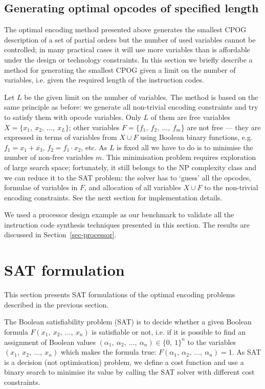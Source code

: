 \subsection{Generating optimal opcodes of specified length\label{Sec:Generating-optimal-opcodes}}

The optimal encoding method presented above generates the smallest
CPOG description of a set of partial orders but the number of used
variables cannot be controlled; in many practical cases it will use
more variables than is affordable under the design or technology constraints.
In this section we briefly describe a method for generating the smallest
CPOG given a limit on the number of variables, i.e. given the required
length of the instruction codes.

Let $L$ be the given limit on the number of variables. The method
is based on the same principle as before: we generate all non-trivial
encoding constraints and try to satisfy them with opcode variables.
Only $L$ of them are free variables $X=\{x_{1},\ x_{2},\ ...,\ x_{L}\}$;
other variables $F=\{f_{1},\ f_{2},\ ...,\ f_{m}$\} are not free
--- they are expressed in terms of variables from $X\cup F$ using
Boolean binary functions, e.g. $f_{1}=x_{1}+\overline{x_{3}}$, $f_{2}=f_{1}\cdot x_{2}$,
etc. As $L$ is fixed all we have to do is to minimise the number
of non-free variables $m$. This minimisation problem requires exploration
of large search space; fortunately, it still belongs to the NP complexity
class and we can reduce it to the SAT problem: the solver has to `guess'
all the opcodes, formulae of variables in $F$, and allocation of
all variables $X\cup F$ to the non-trivial encoding constraints.
See the next section for implementation details.

We used a processor design example as our benchmark to validate all
the instruction code synthesis techniques presented in this section.
The results are discussed in Section~\ref{sec-processor}.



\section{SAT formulation\label{sec:SAT-formulation}}

This section presents SAT formulations of the optimal encoding problems
described in the previous section.

The Boolean satisfiability problem (SAT) is to decide whether a given
Boolean formula $F(x_{1},\ x_{2},\ \dots,\ x_{n})$ is satisfiable
or not, i.e. if it is possible to find an assignment of Boolean values
$(\alpha_{1},\ \alpha_{2},\ \dots,\ \alpha_{n})\in\{0,\ 1\}^{n}$
to the variables $(x_{1},\ x_{2},\ \dots,\ x_{n})$ which makes the
formula true: $F(\alpha_{1},\ \alpha_{2},\ \dots,\ \alpha_{n})=1$.
As SAT is a decision (not optimisation) problem, we define a cost
function and use a binary search to minimise its value by calling
the SAT solver with different cost constraints.

